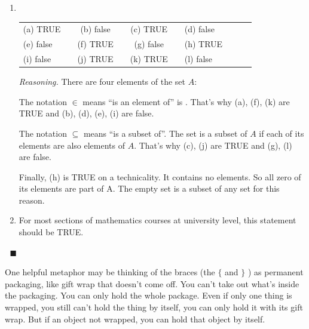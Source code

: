\documentclass[11pt]{article}
\renewcommand\subset\subseteq
\theoremstyle{definition}
\newenvironment{solution}{{\it Solution.} }{\hfill {\color{lightgray}$\blacksquare$}}
\begin{document}
\begin{solution}
\begin{enumerate}
\item $\;$ \\ \vspace*{-12pt} \begin{tabular}{lcclcclccl}
			(a) TRUE && (b) false && (c) TRUE && (d) false \\
			(e) false && (f) TRUE && (g) false && (h) TRUE\\
			(i) false && (j) TRUE && (k) TRUE && (l) false
		\end{tabular}
		
{\it Reasoning.} There are four elements of the set $A$:  
	\vspace*{-4pt}
	
The notation $\in$ means ``is an element of'' is . That's why (a), (f), (k) are TRUE and (b), (d), (e), (i)  are false.

The notation $\subset$ means ``is a subset of''. The set is a subset of $A$ if each of its elements are also elements of $A$.  That's why (c), (j) are TRUE and (g), (l) are false.

Finally, (h) is TRUE on a technicality. It contains no elements. So all zero of its elements are part of A.  The empty set is a subset of any set for this reason. 

\item For most sections of mathematics courses at university level, this statement should be TRUE.\end{enumerate}	

\vspace*{-18pt}$\;$
\end{solution}

\begin{note}
One helpful metaphor may be thinking of the braces (the $\{$ and $\}$ ) as permanent packaging, like gift wrap that doesn't come off. You can't take out what's inside the packaging. You can only hold the whole package. Even if only one thing is wrapped, you still can't hold the thing by itself, you can only hold it with its gift wrap. But if an object not wrapped, you can hold that object by itself.
\end{note}
\end{document}
